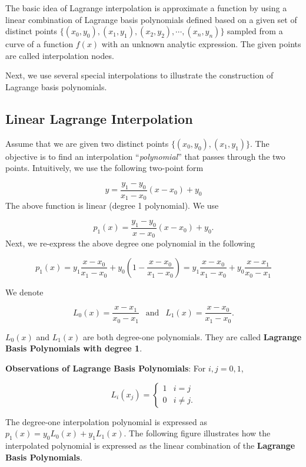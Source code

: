 \documentclass[
]{book}
\begin{document}
The basic idea of Lagrange interpolation is approximate a function by using a linear combination of Lagrange basis polynomials defined based on a given set of distinct points \(\{(x_0, y_0), (x_1, y_1), (x_2, y_2), \cdots, (x_n, y_n)\}\) sampled from a curve of a function \(f(x)\) with an unknown analytic expression. The given points are called interpolation nodes.

Next, we use several special interpolations to illustrate the construction of Lagrange basis polynomials.

\hypertarget{linear-lagrange-interpolation}{%
\subsection{Linear Lagrange Interpolation}\label{linear-lagrange-interpolation}}

Assume that we are given two distinct points \(\{(x_0, y_0), (x_1, y_1)\}\). The objective is to find an interpolation ``\emph{polynomial}'' that passes through the two points. Intuitively, we use the following two-point form

\[
y = \frac{y_1 - y_0}{x_1 - x_0}(x - x_0) + y_0
\]
The above function is linear (degree 1 polynomial). We use

\[
p_1(x) = \frac{y_1 - y_0}{x - x_0}(x - x_0) + y_0.
\]
Next, we re-express the above degree one polynomial in the following

\[
p_1(x) = y_1\frac{x-x_0}{x_1-x_0} + y_0\left(1-\frac{x-x_0}{x_1-x_0} \right) = y_1\frac{x-x_0}{x_1-x_0} + y_0\frac{x-x_1}{x_0-x_1}
\]

We denote

\[
L_0(x) = \frac{x-x_1}{x_0-x_1} \ \ \text{ and } \ \ L_1(x) = \frac{x-x_0}{x_1-x_0} .
\]

\(L_0(x)\) and \(L_1(x)\) are both degree-one polynomials. They are called \textbf{Lagrange Basis Polynomials with degree 1}.

\textbf{Observations of Lagrange Basis Polynomials}: For \(i, j = 0, 1\),

\[
L_i(x_j) = \begin{cases} 
      1 & i = j \\
      0 & i \ne j. 
   \end{cases}
\]

The degree-one interpolation polynomial is expressed as \(p_1(x) = y_0 L_0(x) + y_1 L_1(x)\). The following figure illustrates how the interpolated polynomial is expressed as the linear combination of the \textbf{Lagrange Basis Polynomials}.
\end{document}

